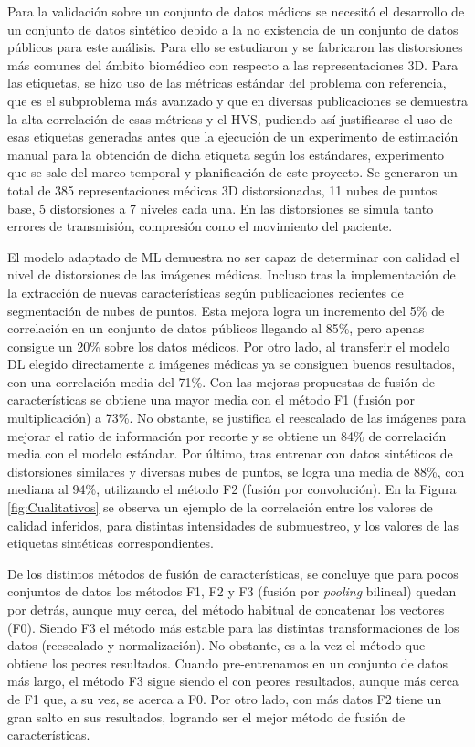 Para la validación sobre un conjunto de datos médicos se necesitó el desarrollo 
de un conjunto de datos sintético debido a la no existencia de un conjunto de 
datos públicos para este análisis. Para ello se estudiaron y se fabricaron las distorsiones más 
comunes del ámbito biomédico con respecto a las representaciones 3D. Para las etiquetas, 
se hizo uso de las métricas estándar del problema con referencia, que es el subproblema 
más avanzado y que en diversas publicaciones se demuestra la alta correlación 
de esas métricas y el HVS, pudiendo así justificarse el uso de esas 
etiquetas generadas antes que la ejecución de un experimento de estimación 
manual para la obtención de dicha etiqueta según los estándares, experimento que se 
sale del marco temporal y planificación de este proyecto. Se generaron 
un total de 385 representaciones médicas 3D distorsionadas, 11 nubes de puntos 
base, 5 distorsiones a 7 niveles cada una. En las distorsiones se simula 
tanto errores de transmisión, compresión como el movimiento del paciente.

El modelo adaptado de ML demuestra no ser capaz de determinar con calidad 
el nivel de distorsiones de las imágenes médicas. Incluso tras la implementación 
de la extracción de nuevas características según publicaciones recientes 
de segmentación de nubes de puntos. Esta mejora logra un incremento del 5\% de correlación en un conjunto de datos públicos llegando al 85\%, pero apenas consigue un 20\% sobre los datos médicos. 
Por otro lado, al transferir el modelo DL elegido directamente a imágenes médicas ya se consiguen 
buenos resultados, con una correlación media del 71\%. Con las mejoras propuestas de 
fusión de características se obtiene una mayor media con el método F1 (fusión por multiplicación) a 73\%. 
No obstante, se justifica el reescalado de las imágenes para mejorar el 
ratio de información por recorte y se obtiene un 84\% de correlación media 
con el modelo estándar. Por último, tras entrenar con datos sintéticos de distorsiones similares y 
diversas nubes de puntos, se logra una media de 88\%, con mediana al 94\%, utilizando el método F2 (fusión por convolución).
En la Figura \ref{fig:Cualitativos} se observa un ejemplo de la correlación entre 
los valores de calidad inferidos, para distintas intensidades de submuestreo, 
y los valores de las etiquetas sintéticas correspondientes. 

De los distintos métodos de fusión de características, se concluye que para 
pocos conjuntos de datos los métodos F1, F2 y F3 (fusión por \emph{pooling} bilineal) quedan por detrás, aunque 
muy cerca, del método habitual de concatenar los vectores (F0). Siendo F3 el método 
más estable para las distintas transformaciones de los datos (reescalado y normalización). 
No obstante, es a la vez el método que obtiene los peores resultados. 
Cuando pre-entrenamos en un conjunto de datos más largo, el método F3 sigue siendo 
el con peores resultados, aunque más cerca de F1 que, a su vez, se acerca a F0. 
Por otro lado, con más datos F2 tiene un gran salto en sus resultados, 
logrando ser el mejor método de fusión de características. 

